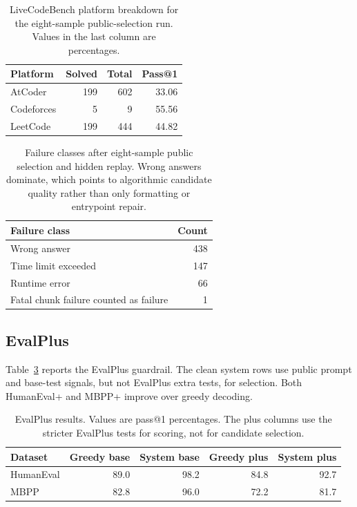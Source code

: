 \documentclass[11pt]{article}
\begin{document}
\begin{table}[H]
\centering
\begin{tabular}{lrrr}
\toprule
Platform & Solved & Total & Pass@1 \\
\midrule
AtCoder & 199 & 602 & 33.06 \\
Codeforces & 5 & 9 & 55.56 \\
LeetCode & 199 & 444 & 44.82 \\
\bottomrule
\end{tabular}
\caption{LiveCodeBench platform breakdown for the eight-sample public-selection
run. Values in the last column are percentages.}
\label{tab:lcb-platform}
\end{table}

\begin{table}[H]
\centering
\begin{tabular}{lr}
\toprule
Failure class & Count \\
\midrule
Wrong answer & 438 \\
Time limit exceeded & 147 \\
Runtime error & 66 \\
Fatal chunk failure counted as failure & 1 \\
\bottomrule
\end{tabular}
\caption{Failure classes after eight-sample public selection and hidden replay.
Wrong answers dominate, which points to algorithmic candidate quality rather
than only formatting or entrypoint repair.}
\label{tab:failures}
\end{table}

\subsection{EvalPlus}

Table~\ref{tab:evalplus} reports the EvalPlus guardrail. The clean system rows
use public prompt and base-test signals, but not EvalPlus extra tests, for
selection. Both HumanEval+ and MBPP+ improve over greedy decoding.

\begin{table}[H]
\centering
\begin{tabular}{lrrrr}
\toprule
Dataset & Greedy base & System base & Greedy plus & System plus \\
\midrule
HumanEval & 89.0 & 98.2 & 84.8 & 92.7 \\
MBPP & 82.8 & 96.0 & 72.2 & 81.7 \\
\bottomrule
\end{tabular}
\caption{EvalPlus results. Values are pass@1 percentages. The plus columns use
the stricter EvalPlus tests for scoring, not for candidate selection.}
\label{tab:evalplus}
\end{table}
\end{document}
